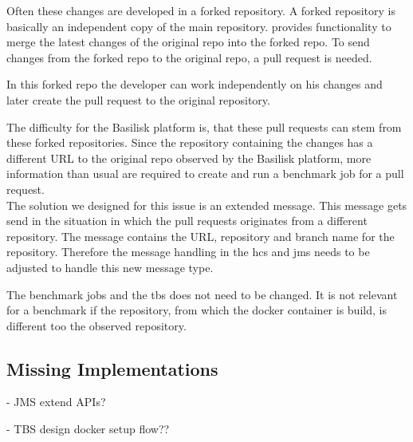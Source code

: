 Often these changes are developed in a forked repository.
A forked repository is basically an independent copy of the main repository.
\gh{} provides functionality to merge the latest changes of the original repo into the forked repo.
To send changes from the forked repo to the original repo, a pull request is needed.

In this forked repo the developer can work independently on his changes and later create the pull request to the original repository.

The difficulty for the Basilisk platform is, that these pull requests can stem from these forked repositories.
Since the repository containing the changes has a different URL to the original repo observed by the Basilisk platform, more information than usual are required to create and run a benchmark job for a pull request.
\\

The solution we designed for this issue is an extended message.
This message gets send in the situation in which the pull requests originates from a different repository.
The message contains the URL, repository and branch name for the \gh{} repository.
Therefore the message handling in the \ac{hcs} and \ac{jms} needs to be adjusted to handle this new message type.

The benchmark jobs and the \acl{tbs} does not need to be changed.
It is not relevant for a benchmark if the repository, from which the docker container is build, is different too the observed repository.


\subsection{Missing Implementations}
- JMS extend APIs?

- TBS design docker setup flow??


